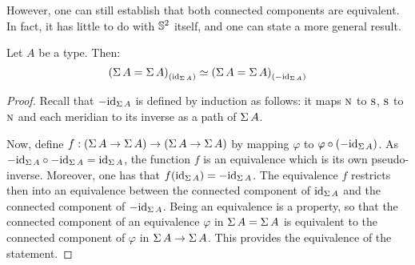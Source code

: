 \documentclass[english,a4paper]{lmcs}
\begin{document}
However, one can still establish that both connected components are equivalent.
In fact, it has little to do with ${{\mathbb S^{2}}}$ itself, and one can state a more
general result.
\begin{prop} \label{prop:equiv-susp-comp}
  Let $A$ be a type. Then:
  \begin{displaymath}
    {(\operatorname{\Sigma}A = \operatorname{\Sigma}A)}_{\left(\mathord{\mathrm{id}}_{\operatorname{\Sigma} A}\right)} \simeq {(\operatorname{\Sigma}A = \operatorname{\Sigma}A)}_{\left(-\mathord{\mathrm{id}}_{\operatorname{\Sigma} A}\right)}
  \end{displaymath}
  \label{prop:susp-components-are-equiv}
\end{prop}
\begin{proof}
  Recall that $-\mathord{\mathrm{id}}_{\operatorname{\Sigma} A}$ is defined by induction as follows: it maps $\textsc{n}$
  to $\textsc{s}$, $\textsc{s}$ to $\textsc{n}$ and each meridian to its inverse as a path of $\operatorname{\Sigma} A$.

  Now, define $f:{({\operatorname{\Sigma} A} \to {\operatorname{\Sigma}A})} \to ({\operatorname{\Sigma} A} \to {\operatorname{\Sigma}A})$ by mapping
  $\varphi$ to $\varphi\circ(-\mathord{\mathrm{id}}_{\operatorname{\Sigma} A})$.
  As $-\mathord{\mathrm{id}}_{\operatorname{\Sigma} A}\circ -\mathord{\mathrm{id}}_{\operatorname{\Sigma} A} = \mathord{\mathrm{id}}_{\operatorname{\Sigma} A}$, the function $f$ is
  an equivalence which is its own pseudo-inverse. Moreover, one has that
  $f(\mathord{\mathrm{id}}_{\operatorname{\Sigma} A}) = -\mathord{\mathrm{id}}_{\operatorname{\Sigma} A}$.
  The equivalence $f$ restricts then into an equivalence between the connected
  component of $\mathord{\mathrm{id}}_{\operatorname{\Sigma} A}$ and the connected component of $-\mathord{\mathrm{id}}_{\operatorname{\Sigma} A}$.
  Being an equivalence is a property, so that the connected component of an
  equivalence $\varphi$ in $\operatorname{\Sigma} A = \operatorname{\Sigma} A$ is equivalent to the connected
  component of $\varphi$ in ${\operatorname{\Sigma} A} \to {\operatorname{\Sigma}A}$. This provides the
  equivalence of the statement.
\end{proof}
\end{document}
